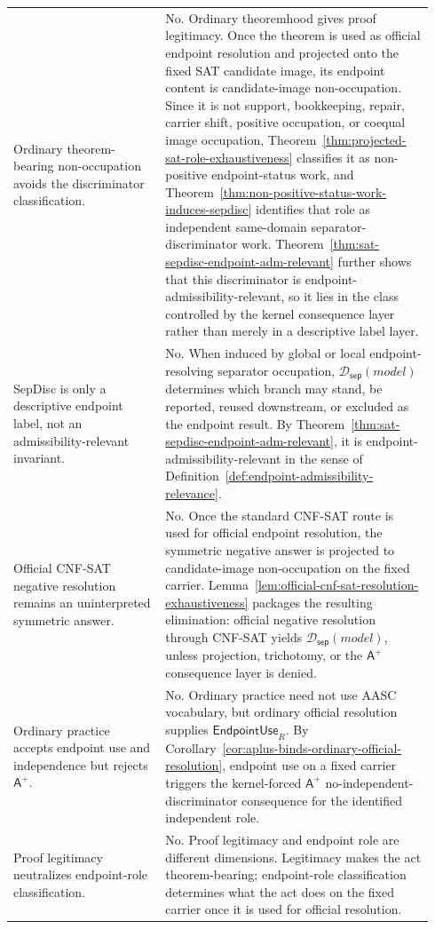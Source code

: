 \documentclass[11pt]{article}
\theoremstyle{definition}
\theoremstyle{remark}
\newcommand{\Aplus}{\mathsf{A}^{+}}
\newcommand{\EndpointUse}{\mathsf{EndpointUse}}
\newcommand{\SepDisc}{\mathcal{D}_{\mathsf{sep}}}
\begin{document}
{\begin{longtable}{>{\raggedright\arraybackslash}p{0.34\linewidth}>{\raggedright\arraybackslash}p{0.60\linewidth}}
Ordinary theorem-bearing non-occupation avoids the discriminator classification. & No. Ordinary theoremhood gives proof legitimacy. Once the theorem is used as official endpoint resolution and projected onto the fixed SAT candidate image, its endpoint content is candidate-image non-occupation. Since it is not support, bookkeeping, repair, carrier shift, positive occupation, or coequal image occupation, Theorem~\ref{thm:projected-sat-role-exhaustiveness} classifies it as non-positive endpoint-status work, and Theorem~\ref{thm:non-positive-status-work-induces-sepdisc} identifies that role as independent same-domain separator-discriminator work. Theorem~\ref{thm:sat-sepdisc-endpoint-adm-relevant} further shows that this discriminator is endpoint-admissibility-relevant, so it lies in the class controlled by the kernel consequence layer rather than merely in a descriptive label layer. \\
SepDisc is only a descriptive endpoint label, not an admissibility-relevant invariant. & No. When induced by global or local endpoint-resolving separator occupation, \(\SepDisc(model)\) determines which branch may stand, be reported, reused downstream, or excluded as the endpoint result. By Theorem~\ref{thm:sat-sepdisc-endpoint-adm-relevant}, it is endpoint-admissibility-relevant in the sense of Definition~\ref{def:endpoint-admissibility-relevance}. \\
Official CNF-SAT negative resolution remains an uninterpreted symmetric answer. & No. Once the standard CNF-SAT route is used for official endpoint resolution, the symmetric negative answer is projected to candidate-image non-occupation on the fixed carrier. Lemma~\ref{lem:official-cnf-sat-resolution-exhaustiveness} packages the resulting elimination: official negative resolution through CNF-SAT yields \(\SepDisc(model)\), unless projection, trichotomy, or the \(\Aplus\) consequence layer is denied. \\
Ordinary practice accepts endpoint use and independence but rejects \(\Aplus\). & No. Ordinary practice need not use AASC vocabulary, but ordinary official resolution supplies \(\EndpointUse_R\). By Corollary~\ref{cor:aplus-binds-ordinary-official-resolution}, endpoint use on a fixed carrier triggers the kernel-forced \(\Aplus\) no-independent-discriminator consequence for the identified independent role. \\
Proof legitimacy neutralizes endpoint-role classification. & No. Proof legitimacy and endpoint role are different dimensions. Legitimacy makes the act theorem-bearing; endpoint-role classification determines what the act does on the fixed carrier once it is used for official resolution. \\

\end{longtable}}
\end{document}
